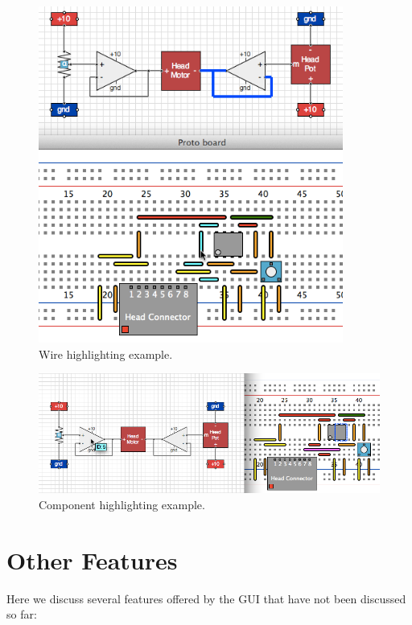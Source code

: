 \begin{figure}
\begin{center}
\includegraphics[width=10cm]{Images/gui_wire_highlight.png}
\caption{Wire highlighting example.}
\label{fig:wire_highlight}
\end{center}
\end{figure}

\begin{figure}
\begin{center}
\includegraphics[width=\textwidth]{Images/gui_component_highlight.png}
\caption{Component highlighting example.}
\label{fig:component_highlight}
\end{center}
\end{figure}

\section{Other Features}

Here we discuss several features offered by the GUI that have not been discussed
so far:

